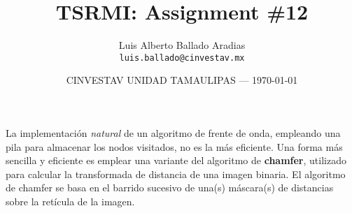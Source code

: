 \documentclass{article}
\title{TSRMI: Assignment \#12} %
\author{Luis Alberto Ballado Aradias\\ \texttt{luis.ballado@cinvestav.mx}} %
\date{CINVESTAV UNIDAD TAMAULIPAS --- \today} %
\begin{document}
\maketitle %


La implementación \textit{natural} de un algoritmo de frente de onda, empleando una pila para almacenar los nodos visitados, no es la más eficiente. Una forma más sencilla y eficiente es emplear una variante del algoritmo de \textbf{chamfer}, utilizado para calcular la transformada de distancia de una imagen binaria. El algoritmo de chamfer se basa en el barrido sucesivo de una(s) máscara(s) de distancias sobre la retícula de la imagen.\\
\end{document}
